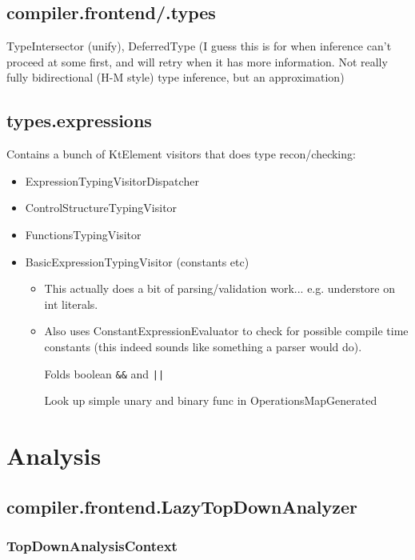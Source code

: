 \documentclass{article}
\begin{document}
\subsection{compiler.frontend/.types}

TypeIntersector (unify), DeferredType (I guess this is for when inference can't proceed at some first, and will retry when it has more information. Not really fully bidirectional (H-M style) type inference, but an approximation)

\subsection{types.expressions}

Contains a bunch of KtElement visitors that does type recon/checking:
\begin{itemize}
\item ExpressionTypingVisitorDispatcher
\item ControlStructureTypingVisitor
\item FunctionsTypingVisitor
\item BasicExpressionTypingVisitor (constants etc)
\begin{itemize}
  \item This actually does a bit of parsing/validation work... e.g. understore on int literals.
  \item Also uses ConstantExpressionEvaluator to check for possible compile time constants (this indeed sounds like something a parser would do).
  
  Folds boolean \texttt{\&\&} and \texttt{||}

  Look up simple unary and binary func in OperationsMapGenerated
\end{itemize}
\end{itemize}

\section{Analysis}

\subsection{compiler.frontend.LazyTopDownAnalyzer}

\subsubsection{TopDownAnalysisContext}
\end{document}
